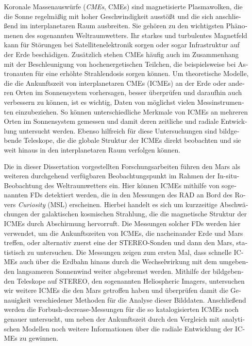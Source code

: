 \begin{otherlanguage}{ngerman}
Koronale Massenauswürfe (\textit{\aclp{CME}}, \acp{CME}) sind magnetisierte Plasmawolken, die die Sonne regelmäßig mit hoher Geschwindigkeit ausstößt und die sich anschließend im interplanetaren Raum ausbreiten. Sie gehören zu den wichtigsten Phänomenen des sogenannten Weltraumwetters.
Ihr starkes und turbulentes Magnetfeld kann für Störungen bei Satellitenelektronik sorgen oder sogar Infrastruktur auf der Erde beschädigen. Zusätzlich stehen \acp{CME} häufig auch im Zusammenhang mit der Beschleunigung von hochenergetischen Teilchen, die beispielsweise bei Astronauten für eine erhöhte Strahlendosis sorgen können.
Um theoretische Modelle, die die Ankunftszeit von interplanetaren \acp{CME} (\acsp{ICME}) an der Erde oder anderen Orten im Sonnensystem vorhersagen, besser überprüfen und daraufhin auch verbessern zu können, ist es wichtig, Daten von möglichst vielen Messinstrumenten einzubeziehen. So können unterschiedliche Merkmale von \acp{ICME} an mehreren Orten im Sonnensystem gemessen und damit deren zeitliche und radiale Entwicklung untersucht werden. Ebenso hilfreich für diese Untersuchungen sind bildgebende Teleskope, die die globale Struktur der \acp{ICME} direkt beobachten und sie weit hinaus in den interplanetaren Raum verfolgen können.

Die in dieser Dissertation vorgestellten Forschungsarbeiten führen den Mars als weiteren durchgehend verfügbaren Beobachtungspunkt im Rahmen der In-situ-Beobachtung des Weltraumwetters ein. Hier können \acp{ICME} mithilfe von sogenannten \aclp{FD} detektiert werden, die in den Messungen des \ac{RAD} an Bord des Rovers \textit{Curiosity} (\acl{MSL}) erscheinen. Hierbei handelt es sich um kurzzeitige Abschwächungen der galaktischen kosmischen Strahlung, die die magnetische Struktur der \acp{ICME} durch Abschirmung hervorruft.
Die Messungen solcher \aclp{FD} werden hier verwendet, um die Ankunftszeiten von \acp{ICME}, die nacheinander Erde und Mars treffen, oder alternativ zuerst eine der \acs{STEREO}-Sonden und dann den Mars, statistisch zu untersuchen. %
Die Messungen zeigen zum ersten Mal, dass schnelle \acp{ICME} auch über die Erdbahn hinaus durch die Wechselwirkung mit dem umgebenden langsameren Sonnenwind weiter abgebremst werden.
Mithilfe der bildgebenden Teleskope auf \acs{STEREO}, den sogenannten Heliospheric Imagers, untersuchen wir weitere \acp{ICME} die den Mars getroffen haben und überprüfen damit die Genauigkeit verschiedener Methoden für die Analyse dieser Bilddaten.
Anschließend werden die Forbush-decrease-Messungen für die so katalogisierten \acp{ICME} noch genauer untersucht, um neben der Ankunftszeit durch den Vergleich mit analytischen Modellen noch weitere Informationen über die radiale Entwicklung der \acp{ICME} zu gewinnen.


\end{otherlanguage}
